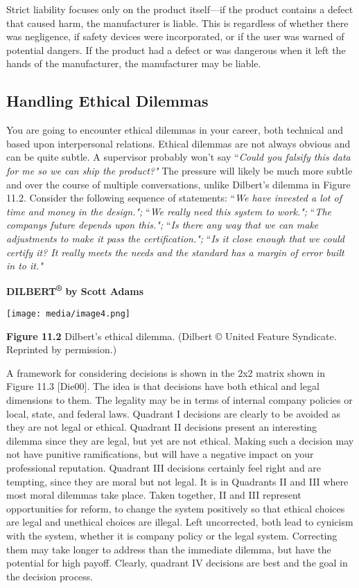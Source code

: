 Strict liability focuses only on the product itself---if the product
contains a defect that caused harm, the manufacturer is liable. This is
regardless of whether there was negligence, if safety devices were
incorporated, or if the user was warned of potential dangers. If the
product had a defect or was dangerous when it left the hands of the
manufacturer, the manufacturer may be liable.

\subsection{Handling Ethical Dilemmas}\label{handling-ethical-dilemmas}

You are going to encounter ethical dilemmas in your career, both
technical and based upon interpersonal relations. Ethical dilemmas are
not always obvious and can be quite subtle. A supervisor probably won't
say ``\emph{Could you falsify this data for me so we can ship the
product?"} The pressure will likely be much more subtle and over the
course of multiple conversations, unlike Dilbert's dilemma in Figure
11.2. Consider the following sequence of statements: ``\emph{We have
invested a lot of time and money in the design.";} ``\emph{We really
need this system to work.";} ``\emph{The company\textquotesingle s
future depends upon this.";} ``\emph{Is there any way that we can make
adjustments to make it pass the certification.";} ``\emph{Is it close
enough that we could certify it? It really meets the needs and the
standard has a margin of error built in to it."}

\textbf{DILBERT\textsuperscript{®} by Scott Adams}

\texttt{[image: media/image4.png]}

\textbf{Figure 11.2} Dilbert's ethical dilemma. (Dilbert © United
Feature Syndicate. Reprinted by permission.)

A framework for considering decisions is shown in the 2x2 matrix shown
in Figure 11.3 {[}Die00{]}. The idea is that decisions have both ethical
and legal dimensions to them. The legality may be in terms of internal
company policies or local, state, and federal laws. Quadrant I decisions
are clearly to be avoided as they are not legal or ethical. Quadrant II
decisions present an interesting dilemma since they are legal, but yet
are not ethical. Making such a decision may not have punitive
ramifications, but will have a negative impact on your professional
reputation. Quadrant III decisions certainly feel right and are
tempting, since they are moral but not legal. It is in Quadrants II and
III where most moral dilemmas take place. Taken together, II and III
represent opportunities for reform, to change the system positively so
that ethical choices are legal and unethical choices are illegal. Left
uncorrected, both lead to cynicism with the system, whether it is
company policy or the legal system. Correcting them may take longer to
address than the immediate dilemma, but have the potential for high
payoff. Clearly, quadrant IV decisions are best and the goal in the
decision process.

